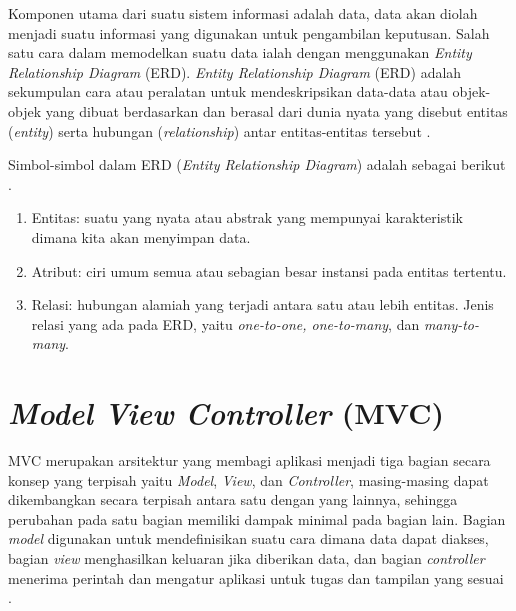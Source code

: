 Komponen utama dari suatu sistem informasi adalah data, data akan diolah menjadi suatu informasi yang digunakan untuk pengambilan keputusan. Salah satu cara dalam memodelkan suatu data ialah dengan menggunakan \textit{Entity Relationship Diagram} (ERD).\textit{ Entity Relationship Diagram} (ERD) adalah sekumpulan cara atau peralatan untuk mendeskripsikan data-data atau objek-objek yang dibuat berdasarkan dan berasal dari dunia nyata yang disebut entitas (\textit{entity}) serta hubungan (\textit{relationship}) antar entitas-entitas tersebut \cite{DoroEdi}. 

Simbol-simbol dalam ERD (\textit{Entity Relationship Diagram}) adalah sebagai berikut \cite{Fridayanthie}.
\begin{enumerate}
	\item Entitas: suatu yang nyata atau abstrak yang mempunyai karakteristik dimana kita akan menyimpan data.
	\item Atribut: ciri umum semua atau sebagian besar instansi pada entitas tertentu.
	\item Relasi: hubungan alamiah yang terjadi antara satu atau lebih entitas. Jenis relasi yang ada pada ERD, yaitu \textit{one-to-one, one-to-many}, dan\textit{ many-to-many}.
	
\end{enumerate}



\section{\emph{Model View Controller} (MVC)}

MVC merupakan arsitektur yang membagi aplikasi menjadi tiga bagian secara konsep yang terpisah yaitu \textit{Model}, \textit{View}, dan \textit{Controller}, masing-masing dapat dikembangkan secara terpisah antara satu dengan yang lainnya, sehingga perubahan pada satu bagian memiliki dampak minimal pada bagian lain. Bagian \textit{model} digunakan untuk mendefinisikan suatu cara dimana data dapat diakses, bagian \textit{view} menghasilkan keluaran jika diberikan data, dan bagian \textit{controller} menerima perintah dan mengatur aplikasi untuk tugas dan tampilan yang sesuai \cite{AriefHidayat}. 

